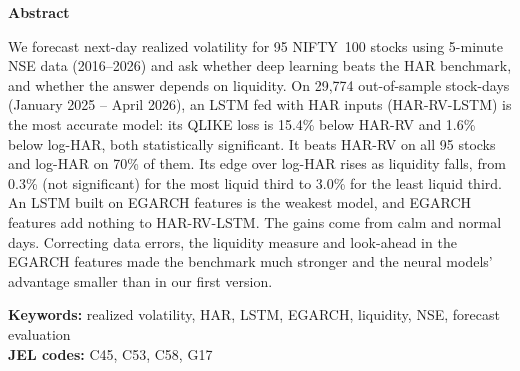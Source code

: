 {\centering\textbf{Abstract}\par}\vspace{6pt}
\noindent We forecast next-day realized volatility for 95 NIFTY~100 stocks using 5-minute NSE data
(2016--2026) and ask whether deep learning beats the HAR benchmark, and whether the answer depends
on liquidity. On 29,774 out-of-sample stock-days (January 2025 -- April 2026), an LSTM fed with HAR
inputs (HAR-RV-LSTM) is the most accurate model: its QLIKE loss is 15.4\% below HAR-RV and 1.6\% below
log-HAR, both statistically significant. It beats HAR-RV on all 95 stocks and log-HAR on 70\% of them.
Its edge over log-HAR rises as liquidity falls, from 0.3\% (not significant) for the most liquid third
to 3.0\% for the least liquid third. An LSTM built on EGARCH features is the weakest model, and EGARCH
features add nothing to HAR-RV-LSTM. The gains come from calm and normal days. Correcting data errors,
the liquidity measure and look-ahead in the EGARCH features made the benchmark much stronger and the
neural models' advantage smaller than in our first version.

\medskip
\noindent\textbf{Keywords:} realized volatility, HAR, LSTM, EGARCH, liquidity, NSE, forecast evaluation\\
\textbf{JEL codes:} C45, C53, C58, G17
